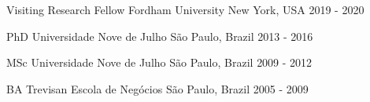 

\begin{cventries}

  \cventry
    {Visiting Research Fellow} %
    {Fordham University} %
    {New York, USA} %
    {2019 - 2020} %

  \cventry
    {PhD} %
    {Universidade Nove de Julho} %
    {São Paulo, Brazil} %
    {2013 - 2016} %

  \cventry
    {MSc} %
    {Universidade Nove de Julho} %
    {São Paulo, Brazil} %
    {2009 - 2012} %

  \cventry
    {BA} %
    {Trevisan Escola de Negócios} %
    {São Paulo, Brazil} %
    {2005 - 2009} %

\end{cventries}
